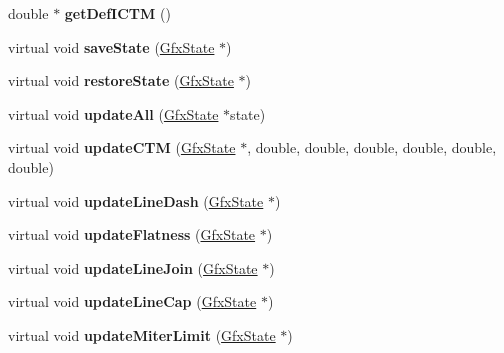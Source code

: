 \begin{DoxyCompactItemize}
double $\ast$ {\bfseries get\+Def\+I\+C\+TM} ()
\item 
\mbox{\label{class_output_dev_a9756dda2c43a69c2f7a07fa226873e8a}} 
virtual void {\bfseries save\+State} (\hyperlink{class_gfx_state}{Gfx\+State} $\ast$)
\item 
\mbox{\label{class_output_dev_a2739adc2b718fba838464fc759cae209}} 
virtual void {\bfseries restore\+State} (\hyperlink{class_gfx_state}{Gfx\+State} $\ast$)
\item 
\mbox{\label{class_output_dev_a93327999b4eb997b33e7d2091c72d7da}} 
virtual void {\bfseries update\+All} (\hyperlink{class_gfx_state}{Gfx\+State} $\ast$state)
\item 
\mbox{\label{class_output_dev_a1f4c88972c59fe75ebe79bec6f22727a}} 
virtual void {\bfseries update\+C\+TM} (\hyperlink{class_gfx_state}{Gfx\+State} $\ast$, double, double, double, double, double, double)
\item 
\mbox{\label{class_output_dev_a21a6c8bac1bb874507cc2858a1775056}} 
virtual void {\bfseries update\+Line\+Dash} (\hyperlink{class_gfx_state}{Gfx\+State} $\ast$)
\item 
\mbox{\label{class_output_dev_a5a5694c57e4c3ee7d9f3a06ff433acb3}} 
virtual void {\bfseries update\+Flatness} (\hyperlink{class_gfx_state}{Gfx\+State} $\ast$)
\item 
\mbox{\label{class_output_dev_a4cd594a8dfcad47a04d5e317bd41263d}} 
virtual void {\bfseries update\+Line\+Join} (\hyperlink{class_gfx_state}{Gfx\+State} $\ast$)
\item 
\mbox{\label{class_output_dev_ae82804bfcaa9c38cb2d7f23862329890}} 
virtual void {\bfseries update\+Line\+Cap} (\hyperlink{class_gfx_state}{Gfx\+State} $\ast$)
\item 
\mbox{\label{class_output_dev_a74a07b0ef9ba5c15bf453fed9c528728}} 
virtual void {\bfseries update\+Miter\+Limit} (\hyperlink{class_gfx_state}{Gfx\+State} $\ast$)
\item 
\mbox{\label{class_output_dev_aceb59d18f9397f4b88e088ecedfb26ee}} 

\end{DoxyCompactItemize}

